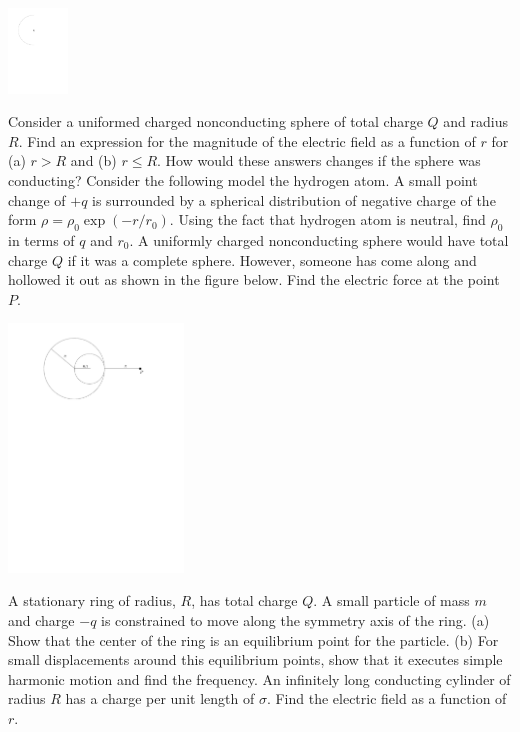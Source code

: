 \documentclass[12pt]{article}
\begin{document}
\includegraphics[width=0.12\textwidth]{semicircle.pdf}


\newpage
\noindent Consider a uniformed charged nonconducting sphere of total charge $Q$ and radius $R$.  Find an expression for the magnitude of the electric field as a function of $r$ for (a) $r>R$ and (b) $r\le R$.  How would these answers changes if the sphere was conducting?
\newpage
\noindent Consider the following model the hydrogen atom.  A small point change of $+q$ is surrounded by a spherical distribution of negative charge of the form $\rho = \rho_0 \exp(-r/r_0)$.  Using the fact that hydrogen atom is neutral, find $\rho_0$ in terms of $q$ and $r_0$.
\newpage
\noindent A uniformly charged nonconducting sphere would have total charge $Q$ if it was a complete sphere.  However, someone has come along and hollowed it out as shown in the figure below.  Find the electric force at the point $P$.

\includegraphics[width=0.35\textwidth]{sphere.pdf}

\newpage
\noindent A stationary ring of radius, $R$, has total charge $Q$.  A small particle of mass $m$ and charge $-q$ is constrained to move along the symmetry axis of the ring.  (a) Show that the center of the ring is an equilibrium point for the particle. (b) For small displacements around this equilibrium points, show that it executes simple harmonic motion and find the frequency.    
\newpage
\noindent An infinitely long conducting cylinder of radius $R$ has a charge per unit length of $\sigma$.  Find the electric field as a function of $r$.  
\end{document}
